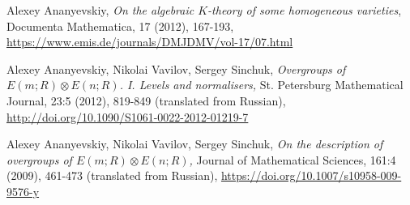 \documentclass[11pt,a4paper,sans]{moderncv}
\begin{document}
\begin{etaremune}[leftmargin=20pt]
	Alexey Ananyevskiy, \emph{On the algebraic $K$-theory of some homogeneous varieties}, Documenta Mathematica, 17 (2012), 167-193, \url{https://www.emis.de/journals/DMJDMV/vol-17/07.html}
	\item
	Alexey Ananyevskiy, Nikolai Vavilov, Sergey Sinchuk, \emph{Overgroups of $E(m;R)\otimes E(n;R)$. I. Levels and normalisers,} St. Petersburg Mathematical Journal, 23:5 (2012), 819-849 (translated from Russian), \url{http://doi.org/10.1090/S1061-0022-2012-01219-7}
	\item
	Alexey Ananyevskiy, Nikolai Vavilov, Sergey Sinchuk, \emph{On the description of overgroups of $E(m;R)\otimes E(n;R)$,} Journal of Mathematical Sciences, 161:4 (2009), 461-473 (translated from Russian), \url{https://doi.org/10.1007/s10958-009-9576-y}
\end{etaremune}
\end{document}
